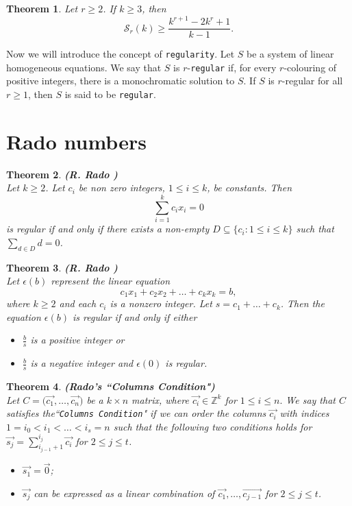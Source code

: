 \documentclass[12pt]{report}
\def\S{\mathcal S}
\def\Z{\mathbb Z}
\def\ora{\overrightarrow}
\newtheorem{thm}{Theorem}[chapter]
\begin{document}
\begin{thm}
Let $r \ge 2$. If $ k \ge 3$, then 
\[ \S_r(k) \ge \frac{k^{r+1}-2k^r+1}{k-1}. \]
\end{thm}

\noindent Now we will introduce the concept of {\tt regularity}. Let $S$ be a system of linear homogeneous equations. We say that $S$ is $r$-{\tt regular} if, for every $r$-colouring of positive integers, there is a monochromatic solution to $S$. If $S$ is $r$-regular for all $r \ge 1$, then $S$ is said to be {\tt regular}. 

\section{Rado numbers}

\begin{thm} {\bf (R. Rado \cite{IS})} \\ [5pt]
Let $k \ge 2$. Let $ c_i$ be non zero integers, $1 \le i \le k$, be constants. Then 
\[ \sum_{i=1}^k c_ix_i = 0 \] 
is regular if and only if there exists a non-empty $D \subseteq \{c_i: 1 \le i \le k\}$ such that $\sum_{d \in D} d=0$.
\end{thm}

\begin{thm} {\bf (R. Rado \cite{IS})} \\ [5pt]
 Let $\epsilon (b)$ represent the linear equation
\[c_1x_1+c_2x_2+\ldots+c_kx_k=b,\]
where $k\ge 2$ and each $c_i$ is a nonzero integer. Let $s=c_1+\ldots+c_k$. Then the equation $\epsilon (b)$ is regular if and only if either 
\begin{itemize} 
\item[{\rm (i)}]
$\frac{b}{s}$ is a positive integer or
\item[{\rm (ii)}]
$\frac{b}{s}$  is a negative integer and $\epsilon(0)$ is regular.
\end{itemize}
\end{thm}

\begin{thm}{\bf (Rado's ``Columns Condition")}\\ [5pt]
Let $C=\big(\ora{c_1}, \ldots, \ora{c_n}\big)$ be a $k \times n$ matrix, where $\ora{c_i} \in \Z^k $ for $1 \le i \le n.$ We say that $C$ satisfies the``{\tt \/Columns Condition}" if we can order the columns $\ora{c_i}$ with indices $1=i_0 < i_1 < \ldots <i_s=n$ such that the following two conditions holds for $\ora{s_j}=\sum_{i_{j-1}+1}^{i_j}\ora{c_i}$ for $2 \le j \le t$.
\begin{itemize}
\item[{\rm (i)}]
$\ora{s_1}=\ora 0$;
\item[{\rm (ii)}]
$\ora{s_j}$ can be expressed as a linear combination of $\ora{c_1}, \ldots, \ora{c_{j-1}}$ for  $2 \le j \le t$.
\end{itemize}
\end{thm}
\end{document}
